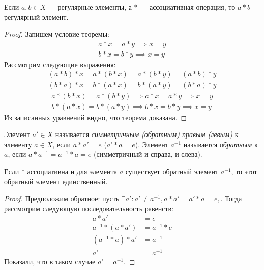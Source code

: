 \begin{theorem}
    Если $a,b\in X$ --- регулярные элементы, а $*$ --- ассоциативная операция, то $a*b$ --- регулярный элемент.
\end{theorem}
\begin{proof}
    Запишем условие теоремы:
    \begin{equation*}
        \begin{gathered}
            a*x=a*y \implies x=y \\
            b*x=b*y \implies x=y
        \end{gathered}
    \end{equation*}
    Рассмотрим следующие выражения:
    \begin{equation*}
        \begin{gathered}
            (a*b)*x=a*(b*x)=a*(b*y)=(a*b)*y\\
            (b*a)*x=b*(a*x)=b*(a*y)=(b*a)*y
        \end{gathered}
    \end{equation*}
    \begin{equation*}
        \begin{gathered}
            a*(b*x)=a*(b*y) \implies a*x=a*y \implies x=y \\
            b*(a*x)=b*(a*y) \implies b*x=b*y \implies x=y
        \end{gathered}
    \end{equation*}
    Из записанных уравнений видно, что теорема доказана.
\end{proof}

\begin{definition}
    Элемент $a'\in X$ называется \emph{симметричным (обратным) правым (левым)} к элементу $a\in X$, если $a*a'=e$ ($a'*a=e$). Элемент $a^{-1}$ называется \textit{обратным} к $a$, если $a*a^{-1}=a^{-1}*a=e$ (симметричный и справа, и слева).
\end{definition}

\begin{theorem}
    Если $*$ ассоциативна и для элемента $a$ существует обратный элемент $a^{-1}$, то этот обратный элемент единственный.
\end{theorem}
\begin{proof}
    Предположим обратное: пусть $\exists a': a'\ne a^{-1}, a*a'=a'*a=e,$. Тогда рассмотрим следующую последовательность равенств:
    \begin{equation*}
        \begin{aligned}
            a*a' &= e\\
            a^{-1}*(a*a') &= a^{-1}*e\\
            (a^{-1}*a)*a' &= a^{-1}\\
            a' &= a^{-1}
        \end{aligned}
    \end{equation*}
    Показали, что в таком случае $a' = a^{-1}$.
\end{proof}

